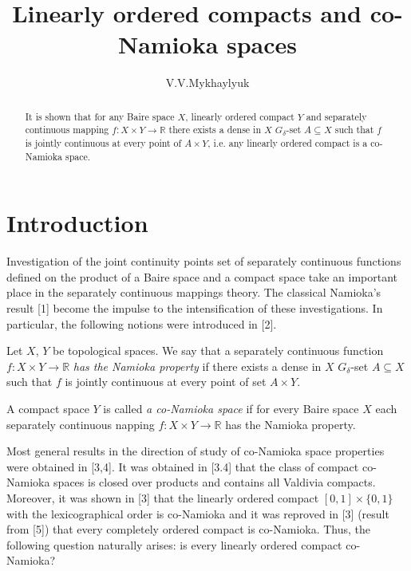 \documentclass{amsart}
\begin{document}
\title{Linearly ordered compacts and co-Namioka spaces}

\author{V.V.Mykhaylyuk}
\address{Department of Mathematics\\
Chernivtsi National University\\ str. Kotsjubyn'skogo 2,
Chernivtsi, 58012 Ukraine}




\begin{abstract}
It is shown that for any Baire space $X$, linearly ordered compact $Y$ and separately continuous mapping $f:X\times Y\to\mathbb R$ there exists a dense in $X$ $G_\delta$-set $A\subseteq X$ such that $f$ is jointly  continuous at every point of $A\times Y$, i.e. any linearly ordered compact is a co-Namioka space.
\end{abstract}

\maketitle
\section{Introduction}

Investigation of the joint continuity points set of separately continuous functions defined on the product of a Baire space and a compact space take an important place in the separately continuous mappings theory. The classical Namioka's result [1] become the impulse to the intensification of these investigations. In particular, the following notions were introduced in [2].

Let $X$, $Y$ be topological spaces. We say that a separately continuous function $f:X\times Y\to \mathbb R$ {\it has the Namioka property} if there exists a dense in $X$ $G_\delta$-set $A\subseteq X$ such that $f$ is jointly continuous at every point of set $A\times Y$.

A compact space $Y$ is called {\it a co-Namioka space} if for every Baire space $X$ each separately continuous napping $f:X\times Y\to \mathbb R$ has the Namioka property.

Most general results in the direction of study of co-Namioka space properties were obtained in [3,4]. It was obtained in [3.4] that the class of compact co-Namioka spaces is closed over products and contains all Valdivia compacts. Moreover, it was shown in [3] that the linearly ordered compact $[0,1]\times \{0,1\}$ with the lexicographical order is co-Namioka and it was reproved in [3]  (result from [5]) that every completely ordered compact is co-Namioka. Thus, the following question naturally arises: is every linearly ordered compact co-Namioka?
\end{document}
